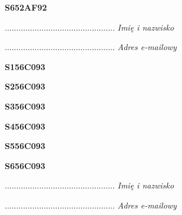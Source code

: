\begin{turn}{90}\huge \textbf{S652AF92}\end{turn}

\begin{turn}{90}\begin{minipage}{\linewidth} \vspace{20mm} ................................................  \textit{Imię i nazwisko}\end{minipage}\end{turn}

\begin{turn}{90}\begin{minipage}{\linewidth} \vspace{20mm} ................................................  \textit{Adres e-mailowy}\end{minipage}\end{turn}

\begin{turn}{90}\huge \textbf{S156C093}\end{turn}

\begin{turn}{90}\huge \textbf{S256C093}\end{turn}

\begin{turn}{90}\huge \textbf{S356C093}\end{turn}

\begin{turn}{90}\huge \textbf{S456C093}\end{turn}

\begin{turn}{90}\huge \textbf{S556C093}\end{turn}

\begin{turn}{90}\huge \textbf{S656C093}\end{turn}

\begin{turn}{90}\begin{minipage}{\linewidth} \vspace{20mm} ................................................  \textit{Imię i nazwisko}\end{minipage}\end{turn}

\begin{turn}{90}\begin{minipage}{\linewidth} \vspace{20mm} ................................................  \textit{Adres e-mailowy}\end{minipage}\end{turn}

